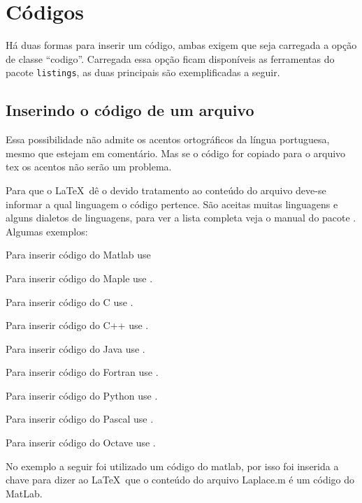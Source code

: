 \chapter{Códigos}\label{codigos}

Há duas formas para inserir um código, ambas exigem que seja carregada a 
opção de classe ``codigo''. Carregada essa opção ficam disponíveis as 
ferramentas do pacote \texttt{listings}, as duas principais são exemplificadas 
a seguir.

\section{Inserindo o código de um arquivo}

Essa possibilidade não admite os acentos ortográficos da língua portuguesa, 
mesmo que estejam em comentário. Mas se o código for copiado para o arquivo tex
os acentos não serão um problema.

Para que o \LaTeX\ dê o devido tratamento ao conteúdo do arquivo 
deve-se informar a qual linguagem o código pertence. São aceitas 
muitas linguagens e alguns dialetos de linguagens, para ver a 
lista completa veja o manual do pacote .
Algumas exemplos:

Para inserir código do Matlab use 

Para inserir código do Maple use .

Para inserir código do C use .

Para inserir código do C++ use .

Para inserir código do Java use .

Para inserir código do Fortran use .

Para inserir código do Python use .

Para inserir código do Pascal use .

Para inserir código do Octave use .

No exemplo a seguir foi utilizado um código do matlab, por isso
foi inserida a chave  para dizer ao \LaTeX\
que o conteúdo do arquivo Laplace.m é um código do MatLab.

\begin{tcolorbox}[breakable]
\begin{lstlisting}
   
\end{lstlisting}
\tcblower

\end{tcolorbox}


